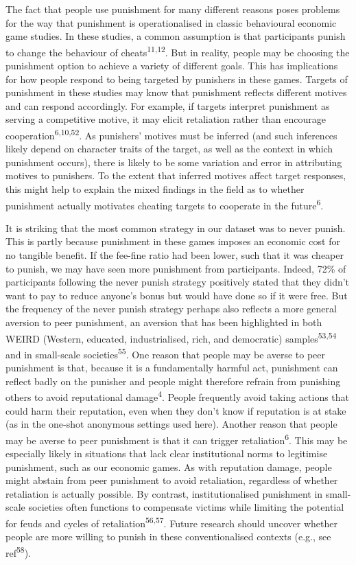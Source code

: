 \documentclass[
  english,
  man, donotrepeattitle,floatsintext]{apa6}
\begin{document}
The fact that people use punishment for many different reasons poses problems
for the way that punishment is operationalised in classic behavioural economic
game studies. In these studies, a common assumption is that participants punish
to change the behaviour of cheats\textsuperscript{11,12}. But in reality, people
may be choosing the punishment option to achieve a variety of different goals.
This has implications for how people respond to being targeted by punishers in
these games. Targets of punishment in these studies may know that punishment
reflects different motives and can respond accordingly. For example, if targets
interpret punishment as serving a competitive motive, it may elicit retaliation
rather than encourage cooperation\textsuperscript{6,10,52}.
As punishers' motives must be inferred (and such inferences likely depend on
character traits of the target, as well as the context in which punishment
occurs), there is likely to be some variation and error in attributing motives
to punishers. To the extent that inferred motives affect target responses, this
might help to explain the mixed findings in the field as to whether punishment
actually motivates cheating targets to cooperate in the future\textsuperscript{6}.

It is striking that the most common strategy in our dataset was to never punish.
This is partly because punishment in these games imposes an economic cost for no
tangible benefit. If the fee-fine ratio had been lower, such that it was cheaper
to punish, we may have seen more punishment from participants. Indeed,
72\%
of participants following the never punish strategy positively stated that they
didn't want to pay to reduce anyone's bonus but would have done so if it were
free. But the frequency of the never punish strategy perhaps also reflects a
more general aversion to peer punishment, an aversion that has been highlighted
in both WEIRD (Western, educated, industrialised, rich, and democratic) samples\textsuperscript{53,54} and in small-scale societies\textsuperscript{55}.
One reason that people may be averse to peer punishment is that, because it is
a fundamentally harmful act, punishment can reflect badly on the punisher and
people might therefore refrain from punishing others to avoid reputational
damage\textsuperscript{4}. People frequently avoid taking actions that could harm
their reputation, even when they don't know if reputation is at stake (as in the
one-shot anonymous settings used here). Another reason that people may be averse
to peer punishment is that it can trigger retaliation\textsuperscript{6}. This may be
especially likely in situations that lack clear institutional norms to
legitimise punishment, such as our economic games. As with reputation damage,
people might abstain from peer punishment to avoid retaliation, regardless of
whether retaliation is actually possible. By contrast, institutionalised
punishment in small-scale societies often functions to compensate victims while
limiting the potential for feuds and cycles of retaliation\textsuperscript{56,57}. Future research should uncover whether people are
more willing to punish in these conventionalised contexts (e.g., see ref\textsuperscript{58}).
\end{document}

